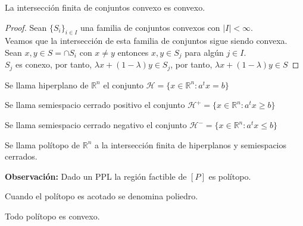 \documentclass[11pt,fleqn]{book} %
\begin{document}
\begin{proposition}
	La intersección finita de conjuntos convexo es convexo.
\end{proposition}

\begin{proof}
	Sean $\{S_i\}_{i \in I}$ una familia de conjuntos convexos con $|I|<\infty$. \\
	Veamos que la intersección de esta familia de conjuntos sigue siendo convexa. \\
	Sean $x, y \in S=\cap S_i$ con $x \neq y$ entonces $x, y \in S_j$ para algún $j\in I$. \\
	$S_j$ es conexo, por tanto, $\lambda x+(1-\lambda)y \in S_j$, por tanto, $\lambda x+(1-\lambda)y \in S$
\end{proof}

\begin{definition}
	Se llama hiperplano de $\mathbb{R}^n$ el conjunto $\mathcal{H}=\{x \in \mathbb{R}^n : a^t x = b \}$ 
\end{definition}

\begin{definition}
	Se llama semiespacio cerrado positivo el conjunto $\mathcal{H}^+=\{x \in \mathbb{R}^n : a^t x \geq b \}$
\end{definition}
\begin{definition}
	Se llama semiespacio cerrado negativo el conjunto $\mathcal{H}^-=\{x \in \mathbb{R}^n : a^t x \leq b \}$
\end{definition}

\begin{definition}[Polítopo]
	Se llama polítopo de $\mathbb{R}^n$ a la intersección finita de hiperplanos y semiespacios cerrados.
\end{definition}
\textbf{Observación: } Dado un PPL la región factible de $[P]$ es polítopo.

\begin{definition}[Poliedro]
	Cuando el polítopo es acotado se denomina poliedro.
\end{definition}

\begin{proposition}
	Todo polítopo es convexo.
\end{proposition}
\end{document}
